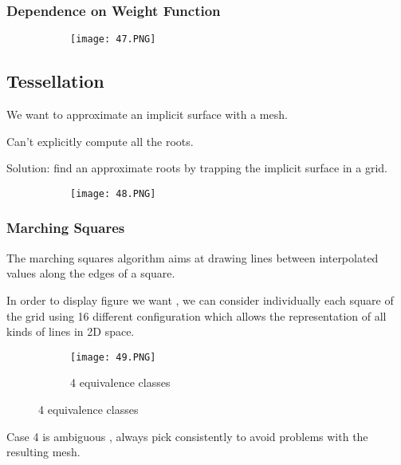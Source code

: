 \documentclass{article}
\begin{document}
\vspace{30mm}

\subsubsection{Dependence on Weight Function}

\begin{figure}[ht!]
  \centering
  \begin{subfigure}[b]{0.7\linewidth}
    \texttt{[image: 47.PNG]}
  \end{subfigure}
\end{figure}


\subsection{Tessellation}

We want to approximate an implicit surface with a mesh.

Can't explicitly compute all the roots.

Solution: find an approximate roots by trapping the implicit surface in a grid.

\begin{figure}[ht!]
  \centering
  \begin{subfigure}[b]{0.7\linewidth}
    \texttt{[image: 48.PNG]}
  \end{subfigure}
\end{figure}

\subsubsection{Marching Squares}

The marching squares algorithm aims at drawing lines between interpolated values along the edges of a square.

In order to display figure we want , we can consider individually each square of the grid using 16 different configuration which allows the representation of all kinds of lines in 2D space.

\begin{figure}[ht!]
  \centering
  \begin{subfigure}[b]{0.4\linewidth}
    \texttt{[image: 49.PNG]}
    \caption{4 equivalence classes}
  \end{subfigure}
\end{figure}

Case 4 is ambiguous , always pick consistently to avoid problems with the resulting mesh.
\end{document}
